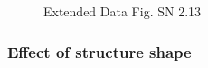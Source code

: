 \documentclass[11pt]{article}
\begin{document}
\begin{figure}[H]
    \centering
    \caption{Extended Data Fig. SN 2.13~\cite{pitfalls-in-segmentation-evaluation}}
\end{figure}


\begin{figure}[H]
    \centering
\end{figure}

\subsubsection{Effect of structure shape}
\end{document}

